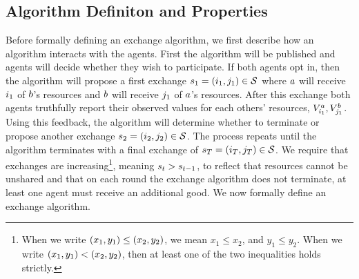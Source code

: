 \subsection{Algorithm Definiton and Properties}
\label{sec:modelalgo}

Before formally defining an exchange algorithm, we first describe how an algorithm interacts with the agents.
First the algorithm will be published and agents will decide whether they wish to participate.
If both agents opt in, then the algorithm
will propose a first exchange 
\(
    s_{1}
    =
    \left(
        i_{1},
        j_{1}
    \right)\in\mathcal{S} 
\)
where $a$ will receive $i_{1}$ of $b$'s resources and 
$b$ will receive $j_{1}$ of $a$'s resources.
After this exchange both agents truthfully report their observed values for 
each others' resources, 
\(
    V^a_{
        i_{1}
    },
    V^b_{
        j_{1}
    }
\).
Using this feedback, the algorithm will determine whether to terminate or propose another 
exchange 
\(
    s_{2}
    =\left(
        i_{2},
        j_{2}
    \right)\in\mathcal{S} 
\).
The process repeats until the algorithm terminates with a final exchange of 
\(
    s_{
        T
    }
    =\left(
        i_{T},
        j_{T}
    \right)\in\mathcal{S} 
\).
We require that exchanges are increasing\footnote{%
When we write $\left(x_1,y_1\right)\leq\left(x_2,y_2\right)$, we mean
\(x_1\leq x_2\), and \(y_1\leq y_2\).
When we write $\left(x_1,y_1\right)<\left(x_2,y_2\right)$, then at least one of the two inequalities holds strictly.
}, meaning $s_{t} > s_{t-1}$,
to reflect that resources cannot be unshared and that on each round the exchange algorithm does not terminate, at least one agent must receive an additional good.
We now formally define an exchange algorithm.

